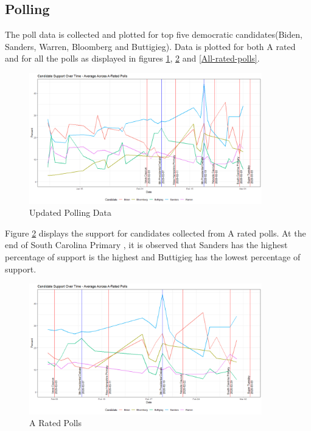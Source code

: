 \subsection{Polling}
The poll data is collected and plotted for top five democratic candidates(Biden, Sanders, Warren, Bloomberg and Buttigieg). Data is plotted for both A rated and for all the polls as displayed in figures \ref{Updated-Polling-Data-1}, \ref{A-rated-polls} and \ref{All-rated-polls}. 
\begin{figure}[H]
    \centering
    \includegraphics[width=0.9\textwidth]{figures/long-A-rated-polls.png}
    \caption{Updated Polling Data}
    \label{Updated-Polling-Data-1}
\end{figure}
Figure \ref{A-rated-polls} displays the support for candidates collected from A rated polls. At the end of  South Carolina Primary , it is observed that Sanders has the highest percentage of support is the highest and Buttigieg has the lowest percentage of support.  
\begin{figure}[H]
    \centering
    \includegraphics[width=0.9\textwidth]{figures/A-rated-polls.png}
    \caption{A Rated Polls}
    \label{A-rated-polls}
\end{figure}

